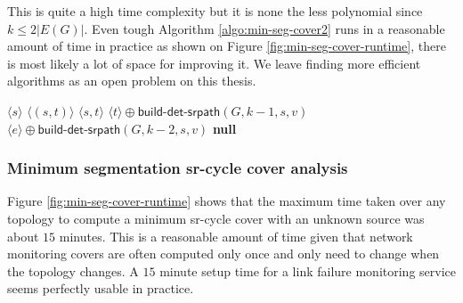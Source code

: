 This is quite a high time complexity but it is none the less polynomial since $k \leq 2 |E(G)|$. Even tough Algorithm \ref{algo:min-seg-cover2} runs in a reasonable amount of time in practice as shown 
on Figure \ref{fig:min-seg-cover-runtime}, there is most likely a lot of space for improving it. We leave finding more efficient algorithms as an open problem on this thesis. 

\begin{algorithm}[t]
\small
\caption{$\textsf{build-det-srpath}\left( G, k, s, t \right)$}
\begin{algorithmic}[1]
{}
  \RETURN $\langle s \rangle$
\ENDIF
    \RETURN $\langle (s, t) \rangle$ 
  \ENDIF
  \RETURN $\langle s, t \rangle$
\ENDIF
{}
    \RETURN $\langle t \rangle \oplus \textsf{build-det-srpath}\left( G, k - 1, s, v \right)$ 
  \ENDIF
\ENDFOR
{}
      \RETURN $\langle e \rangle \oplus \textsf{build-det-srpath}\left( G, k - 2, s, v \right)$ 
    \ENDIF
  \ENDFOR
\ENDFOR
\RETURN \textbf{null}
\end{algorithmic}
\label{algo:build-det-srpath}
\end{algorithm}

\subsubsection*{Minimum segmentation sr-cycle cover analysis}

Figure \ref{fig:min-seg-cover-runtime} shows that the maximum time taken over any topology to compute a minimum sr-cycle cover
with an unknown source was about $15$ minutes. This is a reasonable amount of time given that network monitoring covers are often
computed only once and only need to change when the topology changes. A $15$ minute setup time for a link failure monitoring service
seems perfectly usable in practice.

